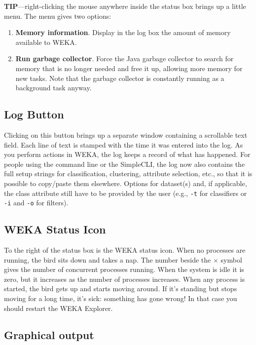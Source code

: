\textbf{TIP}---right-clicking the mouse anywhere inside the status box brings
up a little menu. The menu gives two options: 

\begin{enumerate}
\item \textbf{Memory information}.
Display in the log box the amount of memory available to WEKA.
\item \textbf{Run garbage collector}.
Force the Java garbage collector to search for memory that is no longer needed
and free it up, allowing more memory for new tasks. Note that the garbage
collector is constantly running as a background task anyway.
\end{enumerate}

\subsection{Log Button}

Clicking on this button brings up a separate window containing a scrollable text
field. Each line of text is stamped with the time it was entered into the
log. As you perform actions in WEKA, the log keeps a record of what has
happened. For people using the command line or the SimpleCLI, the log now also 
contains the full setup strings for classification, clustering, attribute selection, 
etc., so that it is possible to copy/paste them elsewhere. 
Options for dataset(s) and, if applicable, the class attribute still have to 
be provided by the user (e.g., \texttt{-t} for classifiers or \texttt{-i} 
and \texttt{-o} for filters).

\subsection{WEKA Status Icon}

To the right of the status box is the WEKA status icon. When no processes are
running, the bird sits down and takes a nap. The number beside the $\times$
symbol gives the number of concurrent processes running.  When the system is
idle it is zero, but it increases as the number of processes increases.
When any process is started, the bird gets up and starts moving around. If
it's standing but stops moving for a long time, it's sick: something has gone
wrong!  In that case you should restart the WEKA Explorer.

\subsection{Graphical output}


